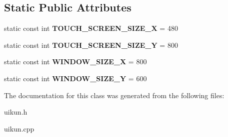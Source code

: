 \subsection*{Static Public Attributes}
\begin{DoxyCompactItemize}
\item 
\hypertarget{classpho_1_1Engine_af6adbe230aed4052bfc7933e34779a45}{static const int {\bfseries T\-O\-U\-C\-H\-\_\-\-S\-C\-R\-E\-E\-N\-\_\-\-S\-I\-Z\-E\-\_\-\-X} = 480}\label{classpho_1_1Engine_af6adbe230aed4052bfc7933e34779a45}

\item 
\hypertarget{classpho_1_1Engine_aabf7a0400411c35a5fcf3f0a7e48eeb2}{static const int {\bfseries T\-O\-U\-C\-H\-\_\-\-S\-C\-R\-E\-E\-N\-\_\-\-S\-I\-Z\-E\-\_\-\-Y} = 800}\label{classpho_1_1Engine_aabf7a0400411c35a5fcf3f0a7e48eeb2}

\item 
\hypertarget{classpho_1_1Engine_a4e1b0277c05451700ad1e0d7b76b22eb}{static const int {\bfseries W\-I\-N\-D\-O\-W\-\_\-\-S\-I\-Z\-E\-\_\-\-X} = 800}\label{classpho_1_1Engine_a4e1b0277c05451700ad1e0d7b76b22eb}

\item 
\hypertarget{classpho_1_1Engine_a25016d27a909cd81e3d0706c36f2489c}{static const int {\bfseries W\-I\-N\-D\-O\-W\-\_\-\-S\-I\-Z\-E\-\_\-\-Y} = 600}\label{classpho_1_1Engine_a25016d27a909cd81e3d0706c36f2489c}

\end{DoxyCompactItemize}


The documentation for this class was generated from the following files\-:\begin{DoxyCompactItemize}
\item 
uikun.\-h\item 
uikun.\-cpp\end{DoxyCompactItemize}
